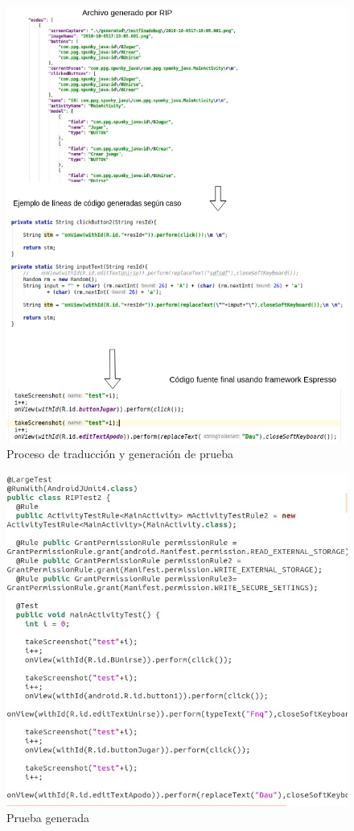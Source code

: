 \begin{figure}[h]
	\centering
	\includegraphics[width=1\textwidth]{img/GeneracionPrueba.png}
	\vspace{-0.5cm}
	\caption{Proceso de traducción y generación de prueba}
	\label{gentest}
\end{figure} 

\begin{figure}[h]
	\centering
	\includegraphics[width=1\textwidth]{img/pruebaResultado.jpg}
	\vspace{-0.5cm}
	\caption{Prueba generada}
	\label{pruebaresultado}
\end{figure} 







	
